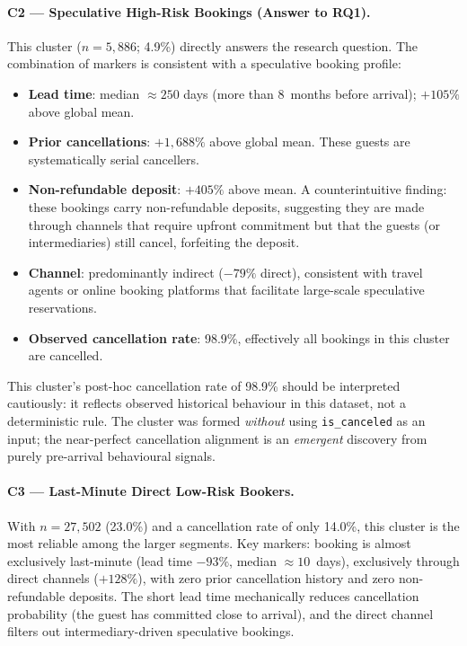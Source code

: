 \documentclass[12pt,a4paper]{article}
\begin{document}
\paragraph{C2 --- Speculative High-Risk Bookings (Answer to RQ1).}
This cluster ($n=5{,}886$; 4.9\%) directly answers the research question.
The combination of markers is consistent with a speculative booking profile:
\begin{itemize}[noitemsep]
  \item \textbf{Lead time}: median $\approx 250$ days (more than 8~months
        before arrival); $+105\%$ above global mean.
  \item \textbf{Prior cancellations}: $+1{,}688\%$ above global mean.
        These guests are systematically serial cancellers.
  \item \textbf{Non-refundable deposit}: $+405\%$ above mean. A counterintuitive
        finding: these bookings carry non-refundable deposits, suggesting they
        are made through channels that require upfront commitment but that the
        guests (or intermediaries) still cancel, forfeiting the deposit.
  \item \textbf{Channel}: predominantly indirect ($-79\%$ direct), consistent
        with travel agents or online booking platforms that facilitate large-scale
        speculative reservations.
  \item \textbf{Observed cancellation rate}: 98.9\%, effectively all bookings
        in this cluster are cancelled.
\end{itemize}
This cluster's post-hoc cancellation rate of 98.9\% should be interpreted
cautiously: it reflects observed historical behaviour in this dataset, not
a deterministic rule.
The cluster was formed \emph{without} using \texttt{is\_canceled} as an input;
the near-perfect cancellation alignment is an \emph{emergent} discovery from
purely pre-arrival behavioural signals.

\paragraph{C3 --- Last-Minute Direct Low-Risk Bookers.}
With $n=27{,}502$ (23.0\%) and a cancellation rate of only 14.0\%, this
cluster is the most reliable among the larger segments.
Key markers: booking is almost exclusively last-minute (lead time $-93\%$,
median $\approx 10$~days), exclusively through direct channels ($+128\%$),
with zero prior cancellation history and zero non-refundable deposits.
The short lead time mechanically reduces cancellation probability (the
guest has committed close to arrival), and the direct channel filters out
intermediary-driven speculative bookings.
\end{document}

